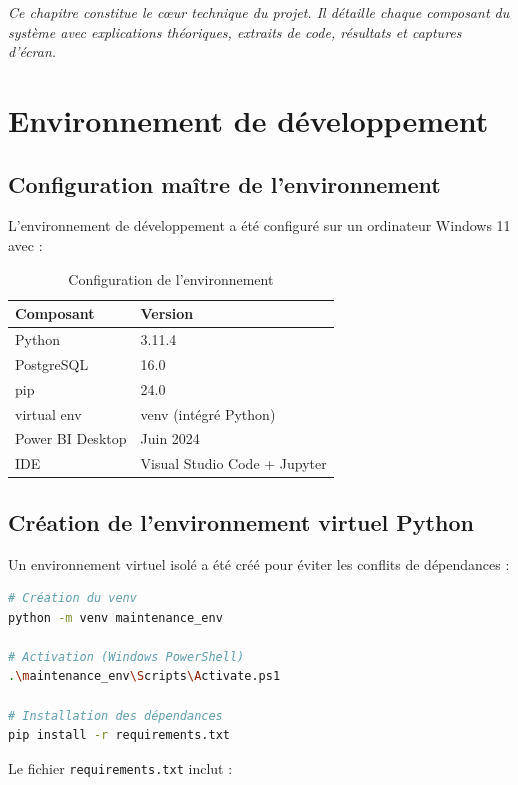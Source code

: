 \documentclass[a4paper,12pt,twoside]{report}
\begin{document}
\emph{Ce chapitre constitue le cœur technique du projet. Il détaille chaque composant du système avec explications théoriques, extraits de code, résultats et captures d'écran.}

\section{Environnement de développement}

\subsection{Configuration maître de l'environnement}

L'environnement de développement a été configuré sur un ordinateur Windows 11 avec :

\begin{table}[H]
\centering
\small
\caption{Configuration de l'environnement}
\begin{tabular}{|l|l|}
\hline
\textbf{Composant} & \textbf{Version} \\
\hline\hline
Python & 3.11.4 \\
\hline
PostgreSQL & 16.0 \\
\hline
pip & 24.0 \\
\hline
virtual env & venv (intégré Python) \\
\hline
Power BI Desktop & Juin 2024 \\
\hline
IDE & Visual Studio Code + Jupyter \\
\hline
\end{tabular}
\end{table}

\subsection{Création de l'environnement virtuel Python}

Un environnement virtuel isolé a été créé pour éviter les conflits de dépendances :

\begin{lstlisting}[language=bash]
# Création du venv
python -m venv maintenance_env

# Activation (Windows PowerShell)
.\maintenance_env\Scripts\Activate.ps1

# Installation des dépendances
pip install -r requirements.txt
\end{lstlisting}

Le fichier \texttt{requirements.txt} inclut :
\end{document}
